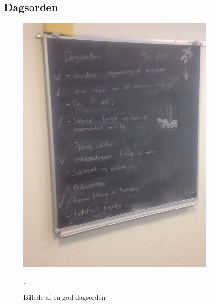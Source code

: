 \documentclass[oneside,a4paper,titlepage]{article}
\begin{document}
\subsection{Dagsorden}
\begin{figure}[H]
   \centering
   \includegraphics[width=10cm]{graphics/dagsorden}
   \caption{Billede af en god dagsorden}.
   \label{fig:dagsorden}
\end{figure}
\end{document}
